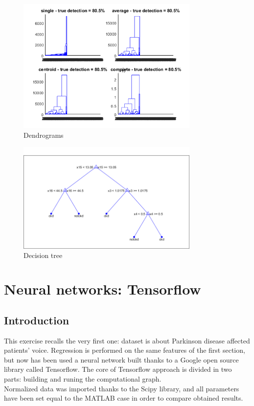 \documentclass{article}
\begin{document}
\label{lst: Hierarchical trees}

\begin{figure}[H]
	\centering
	\includegraphics[width=0.8\textwidth]{pictures/dendrograms.png}
	\caption{Dendrograms}\label{fig:dendrograms}
\end{figure}

\begin{figure}[H]
	\centering
	\includegraphics[width=0.8\textwidth]{pictures/decisionTree.png}
	\caption{Decision tree}\label{fig:Decision tree}
\end{figure}


\newpage
\section{Neural networks: Tensorflow}
\subsection{Introduction}
This exercise recalls the very first one: dataset is about Parkinson disease affected patients' voice. Regression is performed on the same features of the first section, but now has been used a neural network built thanks to a Google open source library called Tensorflow. The core of Tensorflow approach is divided in two parts: building and runing the computational graph.\\
Normalized data was imported thanks to the Scipy library, and all parameters have been set equal to the MATLAB case in order to compare obtained results. 








%
\newpage
\begin{appendix}
	\listoffigures
	\newpage
	\lstlistoflistings
\end{appendix}
\end{document}
